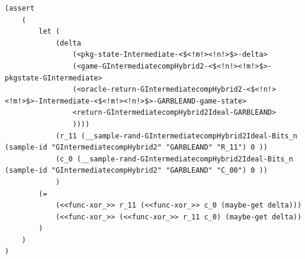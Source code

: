 \begin{longlisting}
\begin{verbatim}
(assert 
    (
        let (
            (delta 
                (<pkg-state-Intermediate-<$<!m!><!n!>$>-delta> 
                (<game-GIntermediatecompHybrid2-<$<!n!><!m!>$>-pkgstate-GIntermediate>
                (<oracle-return-GIntermediatecompHybrid2-<$<!n!><!m!>$>-Intermediate-<$<!m!><!n!>$>-GARBLEAND-game-state> 
                <return-GIntermediatecompHybrid2Ideal-GARBLEAND>
                ))))
            (r_11 (__sample-rand-GIntermediatecompHybrid2Ideal-Bits_n (sample-id "GIntermediatecompHybrid2" "GARBLEAND" "R_11") 0 ))
            (c_0 (__sample-rand-GIntermediatecompHybrid2Ideal-Bits_n (sample-id "GIntermediatecompHybrid2" "GARBLEAND" "C_00") 0 ))        
            )
        (= 
            (<<func-xor_>> r_11 (<<func-xor_>> c_0 (maybe-get delta))) 
            (<<func-xor_>> (<<func-xor_>> r_11 c_0) (maybe-get delta))
        )
    )
)
\end{verbatim}
\caption{An assertion for associativity of the  function without using universal quantifiers}
\label{lst:domino-smtlib-assert-xor-nonuniversal}
\end{longlisting}